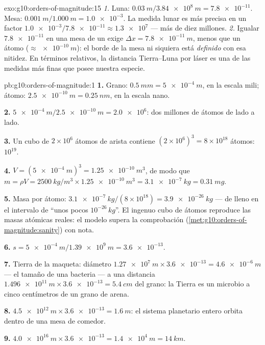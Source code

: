 \begin{solution}{exo:g10:orders-of-magnitude:15}
\emph{1.} Luna: $\qty{0.03}{m}/\qty{3.84e8}{m} = \num{7.8e-11}$. Mesa:
$\qty{0.001}{m}/\qty{1.000}{m} = \num{1.0e-3}$. La medida lunar es más
precisa en un factor
$\num{1.0e-3}/\num{7.8e-11} \approx \num{1.3e7}$ --- más de diez
millones.
\emph{2.} Igualar $\num{7.8e-11}$ en una mesa de un  exige
$\Delta x = \qty{7.8e-11}{m}$, menos que un átomo
($\approx \qty{e-10}{m}$): el borde de la mesa ni siquiera está
\emph{definido} con esa nitidez. En términos relativos, la distancia
Tierra--Luna por láser es una de las medidas más finas que posee nuestra
especie.
\end{solution}

\begin{solution}{pb:g10:orders-of-magnitude:1}
\textbf{1.} Grano: $\qty{0.5}{mm} = \qty{5e-4}{m}$, en la escala mili;
átomo: $\qty{2.5e-10}{m} = \qty{0.25}{nm}$, en la escala nano.

\textbf{2.} $\qty{5e-4}{m}/\qty{2.5e-10}{m} = \num{2.0e6}$: dos millones
de átomos de lado a lado.

\textbf{3.} Un cubo de $2 \times 10^{6}$ átomos de arista contiene
$(2\times10^{6})^{3} = 8 \times 10^{18}$ átomos: 
$10^{19}$.

\textbf{4.} $V = (\qty{5e-4}{m})^{3} = \qty{1.25e-10}{m^3}$, de modo que
$m = \rho V = \qty{2500}{kg/m^3} \times \qty{1.25e-10}{m^3}
= \qty{3.1e-7}{kg} = \qty{0.31}{mg}$.

\textbf{5.} Masa por átomo:
$\qty{3.1e-7}{kg}/(8\times10^{18}) = \qty{3.9e-26}{kg}$ --- de lleno en
el intervalo de ``unos pocos $10^{-26}\,\unit{kg}$''. El ingenuo cubo de
átomos reproduce las masas atómicas reales: el modelo supera la
comprobación (\cref{met:g10:orders-of-magnitude:sanity}) con nota.

\textbf{6.} $s = \qty{5e-4}{m}/\qty{1.39e9}{m} = \num{3.6e-13}$.

\textbf{7.} Tierra de la maqueta: diámetro
$\qty{1.27e7}{m} \times \num{3.6e-13} = \qty{4.6e-6}{m}$ --- el tamaño
de una bacteria --- a una distancia
$\qty{1.496e11}{m} \times \num{3.6e-13} = \qty{5.4}{cm}$ del grano: la
Tierra es un microbio a cinco centímetros de un grano de arena.

\textbf{8.} $\qty{4.5e12}{m} \times \num{3.6e-13} = \qty{1.6}{m}$: el
sistema planetario entero orbita dentro de una mesa de comedor.

\textbf{9.} $\qty{4.0e16}{m} \times \num{3.6e-13} = \qty{1.4e4}{m}
= \qty{14}{km}$.


\end{solution}
